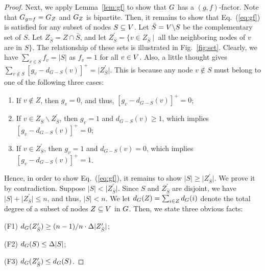 \documentclass[10pt,journal,compsoc]{IEEEtran}
\begin{document}
\begin{proof}
Next, we apply Lemma~\ref{lem:gf} to show that $G$ has a $(g,f)$-factor.
Note that $G_{g=f} = G_{Z}$ and $G_{Z}$ is bipartite.
Then, it remains to show that Eq.~(\ref{eq:gf}) is satisfied for any subset of nodes $S \subseteq V$. 
Let $\bar{S} = V \backslash S$ be the complementary set of $S$. Let 
$Z_{\bar{S}} = Z \cap \bar{S}$, and let $Z_{\bar{S}}^{\prime} = \{ v \in Z_{\bar{S}} ~|~$ all 
the neighboring nodes of $v$ are in $S \}$. The relationship of these sets is illustrated in 
Fig.~\ref{fig:set}. Clearly, we have $\sum_{v \in S} f_v = \lvert S \rvert$ as $f_v=1$ for 
all $v \in V$. Also, a little thought gives 
$\sum_{v \notin S} [g_v - d_{G-S}(v)]^+ = \lvert Z_{\bar{S}}^{\prime} \rvert$. This is because 
any node $v \notin S$ must belong to one of the following three cases:
\begin{enumerate}
\item If $v \notin Z$, then $g_v=0$, and thus, $[g_v - d_{G-S}(v)]^+ = 0$; 

\item If $v \in Z_{\bar{S}} \backslash Z_{\bar{S}}^{\prime}$, then $g_v=1$ and $d_{G-S}(v) \ge 1$, 
which implies $[g_v - d_{G-S}(v)]^+ = 0$;

\item If $v \in Z_{\bar{S}}^{\prime}$, then $g_v=1$ and $d_{G-S}(v)=0$, which implies $[g_v - d_{G-S}(v)]^+ = 1$.
\end{enumerate}

Hence, in order to show Eq.~(\ref{eq:gf}), it remains to show 
$\lvert S \rvert \ge \lvert Z_{\bar{S}}^{\prime} \rvert$.
We prove it by contradiction. Suppose $\lvert S \rvert < \lvert Z_{\bar{S}}^{\prime} \rvert$.
Since $S$ and $Z_{\bar{S}}^{\prime}$ are disjoint, we have 
$\lvert S \rvert  + \lvert Z_{\bar{S}}^{\prime} \rvert \le n$, and thus, $\lvert S \rvert < n$. 
We let $d_{G}(Z) = \sum_{i \in Z} d_{G}(i)$ denote the total degree of a subset 
of nodes $Z \subseteq V$ in $G$. Then, we state three obvious facts:

(F1) $d_{G}(Z_{\bar{S}}^{\prime}) \ge (n-1)/n \cdot \Delta \lvert  Z_{\bar{S}}^{\prime} \rvert$;

(F2) $d_{G}(S) \le \Delta \lvert S \rvert$;

(F3) $d_{G}(Z_{\bar{S}}^{\prime}) \le d_{G}(S)$.


\end{proof}
\end{document}
